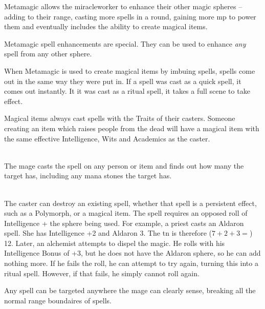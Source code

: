 \begin{multicols}{2}


Metamagic allows the \gls{miracleworker} to enhance their other magic spheres -- adding to their range, casting more spells in a \gls{round}, gaining more \gls{mp} to power them and eventually includes the ability to create magical items.

Metamagic spell enhancements are special.
They can be used to enhance \emph{any} spell from any other sphere.

When Metamagic is used to create magical items by imbuing spells, spells come out in the same way they were put in.
If a spell was cast as a quick spell, it comes out instantly.
It it was cast as a ritual spell, it takes a full scene to take effect.

Magical items always cast spells with the Traits of their casters.
Someone creating an item which raises people from the dead will have a magical item with the same effective Intelligence, Wits and Academics as the caster.

\spelllevel

\\
The mage casts the spell on any person or item and finds out how many  the target has, including any mana stones the target has.

\\
The caster can destroy an existing spell, whether that spell is a persistent effect, such as a Polymorph, or a magical item.
The spell requires an opposed roll of Intelligence + the sphere being used.
For example, a priest casts an Aldaron spell.
She has Intelligence +2 and Aldaron 3.
The \gls{tn} is therefore ($7+2+3=$) 12.
Later, an alchemist attempts to dispel the magic.
He rolls with his Intelligence Bonus of +3, but he does not have the Aldaron sphere, so he can add nothing more.
If he fails the roll, he can attempt to try again, turning this into a ritual spell.
However, if that fails, he simply cannot roll again.


Any spell can be targeted anywhere the mage can clearly sense, breaking all the normal range boundaires of spells.


\end{multicols}
